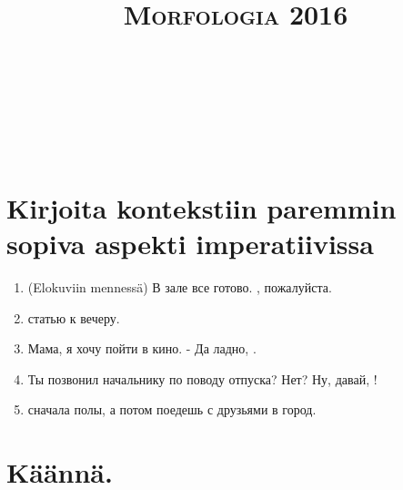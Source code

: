 \documentclass[paper=a4, fontsize=11pt]{scrartcl}
\title{	
\normalfont \normalsize 
\textsc{Morfologia 2016} \\ [25pt] 
\horrule{0.5pt} \\[0.4cm] 
\huge  \\ 
\horrule{2pt} \\[0.5cm] 
}
\date{}
\begin{document}
\onehalfspacing
\section{Kirjoita kontekstiin paremmin sopiva aspekti imperatiivissa} 

\begin{enumerate}
    \item (Elokuviin mennessä) В зале все готово. , пожалуйста.\\
    \item  {} статью к вечеру.\\
    \item Мама, я хочу пойти в кино. - Да ладно, . \\
    \item Ты позвонил начальнику по поводу отпуска? Нет? Ну, давай, ! \\
    \item {} сначала полы, а потом поедешь с друзьями в город.\\
\end{enumerate}

\section{Käännä.}
\end{document}

